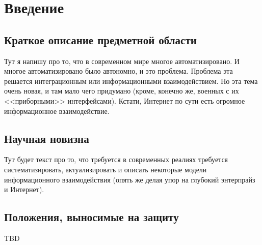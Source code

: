 \section*{Введение}

\subsection*{Краткое описание предметной области}

Тут я напишу про то, что в современном мире многое автоматизировано.
И многое автоматизировано было автономно, и это проблема.
Проблема эта решается интеграционным или информационными взаимодействием.
Но эта тема очень новая, и там мало чего придумано (кроме, конечно же, военных с их <<приборными>> интерфейсами).
Кстати, Интернет по сути есть огромное информационное взаимодействие.

\subsection*{Научная новизна}

Тут будет текст про то, что требуется в современных реалиях требуется систематизировать, актуализировать и описать некоторые модели информационного взаимодействия (опять же делая упор на глубокий энтерпрайз и Интернет).

\subsection*{Положения, выносимые на защиту}

TBD

\clearpage
\newpage